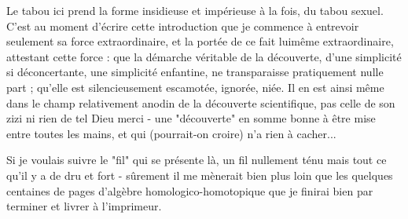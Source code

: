 Le tabou ici prend la forme insidieuse et impérieuse à la fois, du tabou sexuel. C'est au moment d'écrire cette introduction que je commence à entrevoir seulement sa force extraordinaire, et la portée de ce fait luimême extraordinaire, attestant cette force : que la démarche véritable de la découverte, d'une simplicité si déconcertante, une simplicité enfantine, ne transparaisse pratiquement nulle part ; qu'elle est silencieusement escamotée, ignorée, niée. Il en est ainsi même dans le champ relativement anodin de la découverte scientifique, pas celle de son zizi ni rien de tel Dieu merci - une "découverte" en somme bonne à être mise entre toutes les mains, et qui (pourrait-on croire) n'a rien à cacher...

Si je voulais suivre le "fil" qui se présente là, un fil nullement ténu mais tout ce qu'il y a de dru et fort - sûrement il me mènerait bien plus loin que les quelques centaines de pages d'algèbre homologico-homotopique que je finirai bien par terminer et livrer à l'imprimeur.


